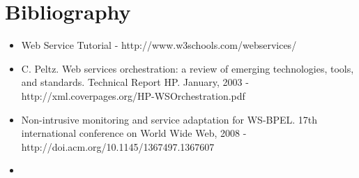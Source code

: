 \documentclass[12pt,a4paper]{article}
\begin{document}
\section{Bibliography}
\begin{itemize}
\item Web Service Tutorial - http://www.w3schools.com/webservices/
\item C. Peltz. Web services orchestration: a review of emerging technologies, tools, and standards. Technical Report HP. January, 2003 - http://xml.coverpages.org/HP-WSOrchestration.pdf
\item Non-intrusive monitoring and service adaptation for WS-BPEL. 17th international conference on World Wide Web, 2008 - http://doi.acm.org/10.1145/1367497.1367607
\item 
\end{itemize}
\end{document}
